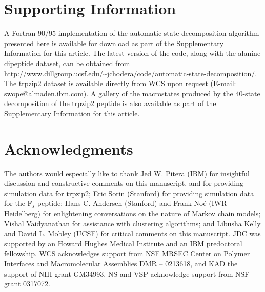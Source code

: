 


\section{Supporting Information}

A Fortran 90/95 implementation of the automatic state decomposition algorithm presented here is available for download as part of the Supplementary Information for this article.
The latest version of the code, along with the alanine dipeptide dataset, can be obtained from \url{http://www.dillgroup.ucsf.edu/~jchodera/code/automatic-state-decomposition/}.
The trpzip2 dataset is available directly from WCS upon request (E-mail: \url{swope@almaden.ibm.com}).
A gallery of the macrostates produced by the 40-state decomposition of the trpzip2 peptide is also available as part of the Supplementary Information for this article.


\section{Acknowledgments}

The authors would especially like to thank Jed W. Pitera (IBM) for insightful discussion and constructive comments on this manuscript, and for providing simulation data for trpzip2; Eric Sorin (Stanford) for providing simulation data for the F$_s$ peptide; Hans C. Andersen (Stanford) and Frank No\'e (IWR Heidelberg) for enlightening conversations on the nature of Markov chain models; Vishal Vaidyanathan for assistance with clustering algorithms; and Libusha Kelly and David L. Mobley (UCSF) for critical comments on this manuscript.
JDC was supported by an Howard Hughes Medical Institute and an IBM predoctoral fellowship.  
WCS acknowledges support from NSF MRSEC Center on Polymer Interfaces and Macromolecular Assemblies DMR -- 0213618, and KAD the support of NIH grant GM34993.
NS and VSP acknowledge support from NSF grant 0317072.

% 
%

%
